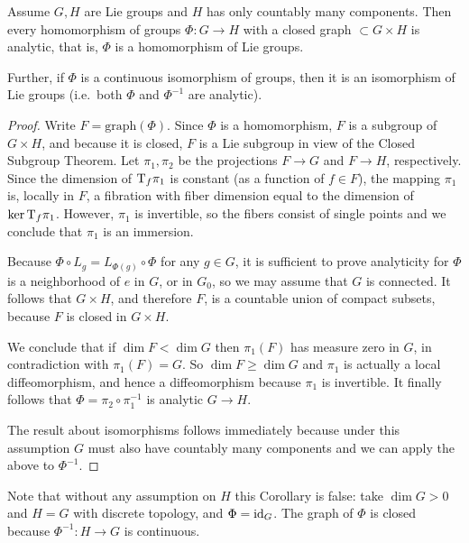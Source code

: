 \begin{cor}[{{\cite[Prop.~1.10.8]{DK}}}]
    Assume $G,H$ are Lie groups and $H$ has only countably many components. Then every homomorphism of groups $\Phi:G\to H$ with a closed graph $\subset G\times H$ is analytic, that is, $\Phi$ is a homomorphism of Lie groups.

    Further, if $\Phi$ is a continuous isomorphism of groups, then it is an isomorphism of Lie groups (i.e.~both $\Phi$ and $\Phi^{-1}$ are analytic).
\end{cor}
\begin{proof}
    Write $F=\mathrm{graph}(\Phi)$. Since $\Phi$ is a homomorphism, $F$ is a subgroup of $G\times H$, and because it is closed, $F$ is a Lie subgroup in view of the Closed Subgroup Theorem. Let $\pi_1,\pi_2$ be the projections $F\to G$ and $F\to H$, respectively. Since the dimension of $\mathrm{T}_f\pi_1$ is constant (as a function of $f\in F$), the mapping $\pi_1$ is, locally in $F$, a fibration with fiber dimension equal to the dimension of $\ker \mathrm{T}_f\pi_1$. However, $\pi_1$ is invertible, so the fibers consist of single points and we conclude that $\pi_1$ is an immersion.

    Because $\Phi\circ L_g=L_{\Phi(g)}\circ\Phi$ for any $g\in G$, it is sufficient to prove analyticity for $\Phi$ is a neighborhood of $e$ in $G$, or in $G_0$, so we may assume that $G$ is connected. It follows that $G\times H$, and therefore $F$, is a countable union of compact subsets, because $F$ is closed in $G\times H$.

    We conclude that if $\dim F<\dim G$ then $\pi_1(F)$ has measure zero in $G$, in contradiction with $\pi_1(F)=G$. So $\dim F\geq \dim G$ and $\pi_1$ is actually a local diffeomorphism, and hence a diffeomorphism because $\pi_1$ is invertible. It finally follows that $\Phi=\pi_2\circ\pi_1^{-1}$ is analytic $G\to H$.

    The result about isomorphisms follows immediately because under this assumption $G$ must also have countably many components and we can apply the above to $\Phi^{-1}$.
\end{proof}

\begin{rem}
    Note that without any assumption on $H $ this Corollary is false: take $\dim G>0$ and $H=G$ with discrete topology, and $\Phi=\operatorname{id}_G$. The graph of $\Phi$ is closed because $\Phi^{-1}:H\to G$ is continuous.
\end{rem}


